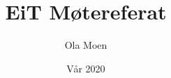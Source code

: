 \documentclass{article}
\title{EiT Møtereferat}
\author{Ola Moen}
\date{Vår 2020}
\begin{document}
\maketitle

\section{}
\end{document}
